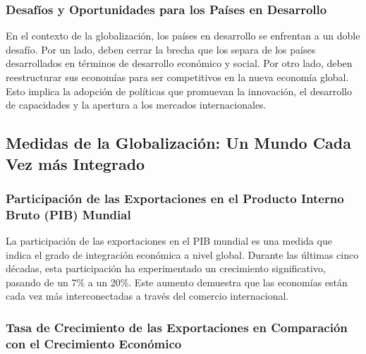 \documentclass[
  a4paper,
]{article}
\begin{document}
\hypertarget{desafuxedos-y-oportunidades-para-los-pauxedses-en-desarrollo}{%
\subsubsection{Desafíos y Oportunidades para los Países en
Desarrollo}\label{desafuxedos-y-oportunidades-para-los-pauxedses-en-desarrollo}}

En el contexto de la globalización, los países en desarrollo se
enfrentan a un doble desafío. Por un lado, deben cerrar la brecha que
los separa de los países desarrollados en términos de desarrollo
económico y social. Por otro lado, deben reestructurar sus economías
para ser competitivos en la nueva economía global. Esto implica la
adopción de políticas que promuevan la innovación, el desarrollo de
capacidades y la apertura a los mercados internacionales.

\hypertarget{medidas-de-la-globalizaciuxf3n-un-mundo-cada-vez-muxe1s-integrado}{%
\subsection{Medidas de la Globalización: Un Mundo Cada Vez más
Integrado}\label{medidas-de-la-globalizaciuxf3n-un-mundo-cada-vez-muxe1s-integrado}}

\hypertarget{participaciuxf3n-de-las-exportaciones-en-el-producto-interno-bruto-pib-mundial}{%
\subsubsection{Participación de las Exportaciones en el Producto Interno
Bruto (PIB)
Mundial}\label{participaciuxf3n-de-las-exportaciones-en-el-producto-interno-bruto-pib-mundial}}

La participación de las exportaciones en el PIB mundial es una medida
que indica el grado de integración económica a nivel global. Durante las
últimas cinco décadas, esta participación ha experimentado un
crecimiento significativo, pasando de un 7\% a un 20\%. Este aumento
demuestra que las economías están cada vez más interconectadas a través
del comercio internacional.

\hypertarget{tasa-de-crecimiento-de-las-exportaciones-en-comparaciuxf3n-con-el-crecimiento-econuxf3mico}{%
\subsubsection{Tasa de Crecimiento de las Exportaciones en Comparación
con el Crecimiento
Económico}\label{tasa-de-crecimiento-de-las-exportaciones-en-comparaciuxf3n-con-el-crecimiento-econuxf3mico}}
\end{document}
